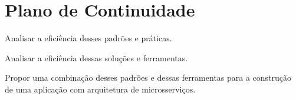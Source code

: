 \chapter*{Plano de Continuidade}

Analisar a eficiência desses padrões e práticas.

Analisar a eficiência dessas soluções e ferramentas.

Propor uma combinação desses padrões e dessas ferramentas para a construção de uma aplicação com arquitetura de microsserviços.